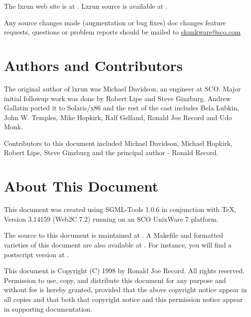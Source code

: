 \documentclass[letterpaper]{article}
\begin{document}
The lxrun web site is at 
.
Lxrun source is available at
.

Any source changes made (augmentation or bug fixes) doc changes
feature requests, questions or problem reports should be mailed to 
\url{skunkware@sco.com}




\section{Authors and Contributors}

The original author of lxrun was Michael Davidson, an engineer at SCO.
Major initial followup work was done by Robert Lipe and Steve Ginzburg.
Andrew Gallatin ported it to Solaris/x86 and the rest of the cast includes
Bela Lubkin, John W. Temples, Mike Hopkirk, Ralf Gelfand, 
Ronald Joe Record and Udo Monk.

Contributors to this document included Michael Davidson, Michael Hopkirk,
Robert Lipe, Steve Ginzburg and the principal author - Ronald Record.




\section{About This Document}

This document was created using SGML-Tools 1.0.6 in conjunction with TeX, 
Version 3.14159 (Web2C 7.2) running on an SCO UnixWare 7 platform. 

The source to this document is maintained at
.
A Makefile and formatted varieties of this document are also available at
. For instance,
you will find a postscript version at
.

This document is Copyright (C) 1998 by Ronald Joe Record.
All rights reserved. Permission to use, copy, and distribute this 
document for any purpose and without fee is hereby granted, provided 
that the above copyright notice appear in all copies and that both that 
copyright notice and this permission notice appear in supporting documentation.
\end{document}
